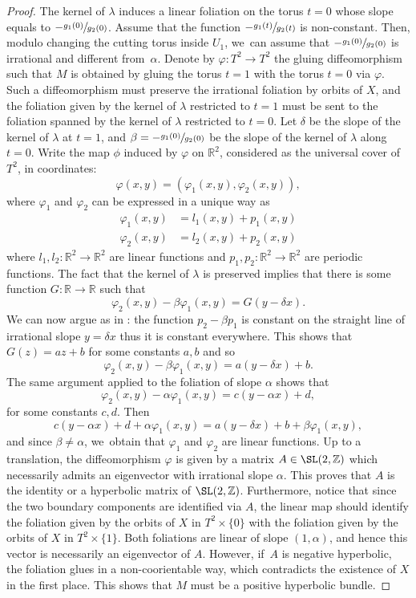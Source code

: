 \begin{proof}
The kernel of $\lambda$ induces a linear foliation on the torus $t=0$ whose slope equals to $-\sfrac{g_1(0)}{g_2(0)}$. Assume that the function $-\sfrac{g_1(t)}{g_2(t)}$ is non-constant. Then, modulo changing the cutting torus inside $U_1$, we~can assume that $-\sfrac{g_1(0)}{g_2(0)}$ is irrational and different from~$\alpha$. Denote by $\varphi:T^2 \to T^2 $
the gluing diffeomorphism such that $M$ is obtained by gluing the torus $t=1$ with the torus $t=0$ via $\varphi$. Such a diffeomorphism must preserve the irrational foliation by orbits of $X$, and the foliation given by the kernel of $\lambda$ restricted to $t=1$ must be sent to the foliation spanned by the kernel of $\lambda$ restricted to $t=0$. Let $\delta$ be the slope of the kernel of $\lambda$ at $t=1$, and $\beta=-\sfrac{g_1(0)}{g_2(0)}$ be the slope of the kernel of $\lambda$ along $t=0$. Write the map $\phi$ induced by $\varphi$ on $\mathbb{R}^2$, considered as the universal cover of $T^2$, in coordinates:
\[
\varphi(x,y)= (\varphi_1(x,y), \varphi_2(x,y)),
\]
where $\varphi_1$ and $\varphi_2$ can be expressed in a unique way as
\begin{align*}
\varphi_1(x,y)&=l_1(x,y)+p_1(x,y)\\
\varphi_2(x,y)&=l_2(x,y)+p_2(x,y)
\end{align*}
where $l_1,l_2:\mathbb{R}^2\to \mathbb{R}^2$ are linear functions and $p_1,p_2:\mathbb{R}^2\to \mathbb{R}^2$ are periodic functions. The fact that the kernel of $\lambda$ is preserved implies that there is some function $G:\mathbb{R}\to \mathbb{R}$ such that
\[
\varphi_2(x,y)-\beta \varphi_1(x,y)=G(y-\delta x).
\]
We can now argue as in \cite[Lem.\,4.4]{Re}: the function $p_2-\beta p_1$ is constant on the straight line of irrational slope $y=\delta x$ thus it is constant everywhere. This shows that $G(z)=az+b$ for some constants $a,b$ and so
\[
\varphi_2(x,y)-\beta \varphi_1(x,y)=a(y-\delta x)+b.
\]
The same argument applied to the foliation of slope $\alpha$ shows that
\[
\varphi_2(x,y)-\alpha \varphi_1(x,y)=c(y-\alpha x)+d,
\]
for some constants $c,d$. Then
\[
c(y-\alpha x)+d+\alpha \varphi_1(x,y)= a(y-\delta x)+b+\beta \varphi_1(x,y),
\]
and since $\beta\neq \alpha$, we~obtain that $\varphi_1$ and $\varphi_2$ are linear functions. Up to a translation, the diffeomorphism $\varphi$ is given by a matrix $A \in \SL(2,\mathbb{Z})$ which necessarily admits an eigenvector with irrational slope $\alpha$. This proves that $A$ is the identity or a hyperbolic matrix of $\SL(2,\mathbb{Z})$. Furthermore, notice that since the two boundary components are identified via $A$, the linear map should identify the foliation given by the orbits of $X$ in $T^2\times \{0\}$ with the foliation given by the orbits of $X$ in $T^2\times \{1\}$. Both foliations are linear of slope $(1,\alpha)$, and hence this vector is necessarily an eigenvector of $A$. However, if~$A$ is negative hyperbolic, the foliation glues in a non-coorientable way, which contradicts the existence of $X$ in the first place. This shows that $M$ must be a positive hyperbolic bundle.


\end{proof}

